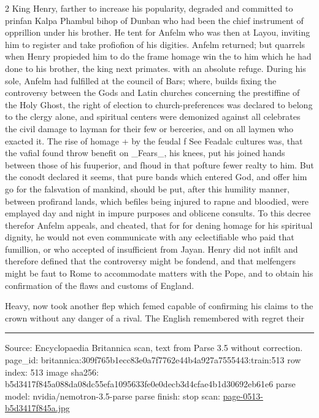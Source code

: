 \documentclass[10pt]{article}
\begin{document}
\begin{multicols}{2}
King Henry, farther to increase his popularity, degraded and committed to prinfan Kalpa Phambul bihop of Dunban who had been the chief instrument of opprillion under his brother. He tent for Anfelm who was then at Layou, inviting him to register and take profiofion of his digities. Anfelm returned; but quarrels when Henry propieded him to do the frame homage win the to him which he had done to his brother, the king next primates. with an absolute refuge. During his sole, Anfelm had fulfilled at the council of Bars; where, builds fixing the controversy between the Gods and Latin churches concerning the prestiffine of the Holy Ghost, the right of election to church-preferences was declared to belong to the clergy alone, and spiritual centers were demonized against all celebrates the civil damage to layman for their few or berceries, and on all laymen who exacted it. The rise of homage + by the feudal f See Feadalc cultures was, that the vafial found throw benefit on \_Fears\_, his knees, put his joined hands between those of his fuuperior, and fhoud in that pofture fewer realty to him. But the conodt declared it seems, that pure bands which entered God, and offer him go for the falsvation of mankind, should be put, after this humility manner, between profirand lands, which befiles being injured to rapne and bloodied, were emplayed day and night in impure purposes and oblicene consults. To this decree therefor Anfelm appeals, and cheated, that for for dening homage for his spiritual dignity, he would not even communicate with any eclectifiable who paid that fumillion, or who accepted of insufficient from Jayan. Henry did not infilt and therefore defined that the controversy might be fondend, and that melfengers might be faut to Rome to accommodate matters with the Pope, and to obtain his confirmation of the flaws and customs of England.

Heavy, now took another flep which femed capable of confirming his claims to the crown without any danger of a rival. The English remembered with regret their

\end{multicols}
\vfill\par\noindent\rule{\linewidth}{0.4pt}\par
{\scriptsize\color{gray}\noindent Source: Encyclopaedia Britannica scan, text from Parse 3.5 without correction. page\_id: britannica:309f765b1ecc83e0a7f7762e44b4a927a7555443:train:513 \quad row index: 513 \quad image sha256: b5d3417f845a088da08dc55efa1095633fe0e0decb3d4cfae4b1d30692eb61e6 \quad parse model: nvidia/nemotron-3.5-parse \quad parse finish: stop \quad scan: \href{../scans/page-0513-b5d3417f845a.jpg}{page-0513-b5d3417f845a.jpg}\par}
\end{document}
